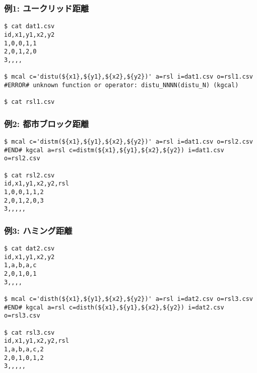 
\subsubsection*{例1: ユークリッド距離}


\begin{Verbatim}[baselinestretch=0.7,frame=single]
$ cat dat1.csv
id,x1,y1,x2,y2
1,0,0,1,1
2,0,1,2,0
3,,,,

$ mcal c='distu(${x1},${y1},${x2},${y2})' a=rsl i=dat1.csv o=rsl1.csv
#ERROR# unknown function or operator: distu_NNNN(distu_N) (kgcal)

$ cat rsl1.csv
\end{Verbatim}

\subsubsection*{例2: 都市ブロック距離}


\begin{Verbatim}[baselinestretch=0.7,frame=single]
$ mcal c='distm(${x1},${y1},${x2},${y2})' a=rsl i=dat1.csv o=rsl2.csv
#END# kgcal a=rsl c=distm(${x1},${y1},${x2},${y2}) i=dat1.csv o=rsl2.csv

$ cat rsl2.csv
id,x1,y1,x2,y2,rsl
1,0,0,1,1,2
2,0,1,2,0,3
3,,,,,
\end{Verbatim}

\subsubsection*{例3: ハミング距離}


\begin{Verbatim}[baselinestretch=0.7,frame=single]
$ cat dat2.csv
id,x1,y1,x2,y2
1,a,b,a,c
2,0,1,0,1
3,,,,

$ mcal c='disth(${x1},${y1},${x2},${y2})' a=rsl i=dat2.csv o=rsl3.csv
#END# kgcal a=rsl c=disth(${x1},${y1},${x2},${y2}) i=dat2.csv o=rsl3.csv

$ cat rsl3.csv
id,x1,y1,x2,y2,rsl
1,a,b,a,c,2
2,0,1,0,1,2
3,,,,,
\end{Verbatim}
